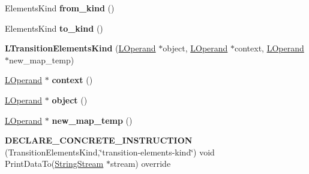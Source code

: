 \begin{DoxyCompactItemize}
\item 
Elements\+Kind {\bfseries from\+\_\+kind} ()\hypertarget{classv8_1_1internal_1_1_l_transition_elements_kind_af634084f5d3f05e0700cc8d35a797465}{}\label{classv8_1_1internal_1_1_l_transition_elements_kind_af634084f5d3f05e0700cc8d35a797465}

\item 
Elements\+Kind {\bfseries to\+\_\+kind} ()\hypertarget{classv8_1_1internal_1_1_l_transition_elements_kind_a131f478caf0a117639ee35cd0bdeed59}{}\label{classv8_1_1internal_1_1_l_transition_elements_kind_a131f478caf0a117639ee35cd0bdeed59}

\item 
{\bfseries L\+Transition\+Elements\+Kind} (\hyperlink{classv8_1_1internal_1_1_l_operand}{L\+Operand} $\ast$object, \hyperlink{classv8_1_1internal_1_1_l_operand}{L\+Operand} $\ast$context, \hyperlink{classv8_1_1internal_1_1_l_operand}{L\+Operand} $\ast$new\+\_\+map\+\_\+temp)\hypertarget{classv8_1_1internal_1_1_l_transition_elements_kind_a6a44fc06b9c2f761c817997ec00269f3}{}\label{classv8_1_1internal_1_1_l_transition_elements_kind_a6a44fc06b9c2f761c817997ec00269f3}

\item 
\hyperlink{classv8_1_1internal_1_1_l_operand}{L\+Operand} $\ast$ {\bfseries context} ()\hypertarget{classv8_1_1internal_1_1_l_transition_elements_kind_aad280c0f1cf8e5ca120cf21b05bd93f0}{}\label{classv8_1_1internal_1_1_l_transition_elements_kind_aad280c0f1cf8e5ca120cf21b05bd93f0}

\item 
\hyperlink{classv8_1_1internal_1_1_l_operand}{L\+Operand} $\ast$ {\bfseries object} ()\hypertarget{classv8_1_1internal_1_1_l_transition_elements_kind_a0257a511e1579fbc39001caf5b0ca855}{}\label{classv8_1_1internal_1_1_l_transition_elements_kind_a0257a511e1579fbc39001caf5b0ca855}

\item 
\hyperlink{classv8_1_1internal_1_1_l_operand}{L\+Operand} $\ast$ {\bfseries new\+\_\+map\+\_\+temp} ()\hypertarget{classv8_1_1internal_1_1_l_transition_elements_kind_a4a446ffbd6e39017d357109db06dd661}{}\label{classv8_1_1internal_1_1_l_transition_elements_kind_a4a446ffbd6e39017d357109db06dd661}

\item 
{\bfseries D\+E\+C\+L\+A\+R\+E\+\_\+\+C\+O\+N\+C\+R\+E\+T\+E\+\_\+\+I\+N\+S\+T\+R\+U\+C\+T\+I\+ON} (Transition\+Elements\+Kind,\char`\"{}transition-\/elements-\/kind\char`\"{}) void Print\+Data\+To(\hyperlink{classv8_1_1internal_1_1_string_stream}{String\+Stream} $\ast$stream) override\hypertarget{classv8_1_1internal_1_1_l_transition_elements_kind_ac3d3fcdb1323fb5a8ffe1c35ad9d633e}{}\label{classv8_1_1internal_1_1_l_transition_elements_kind_ac3d3fcdb1323fb5a8ffe1c35ad9d633e}


\end{DoxyCompactItemize}
